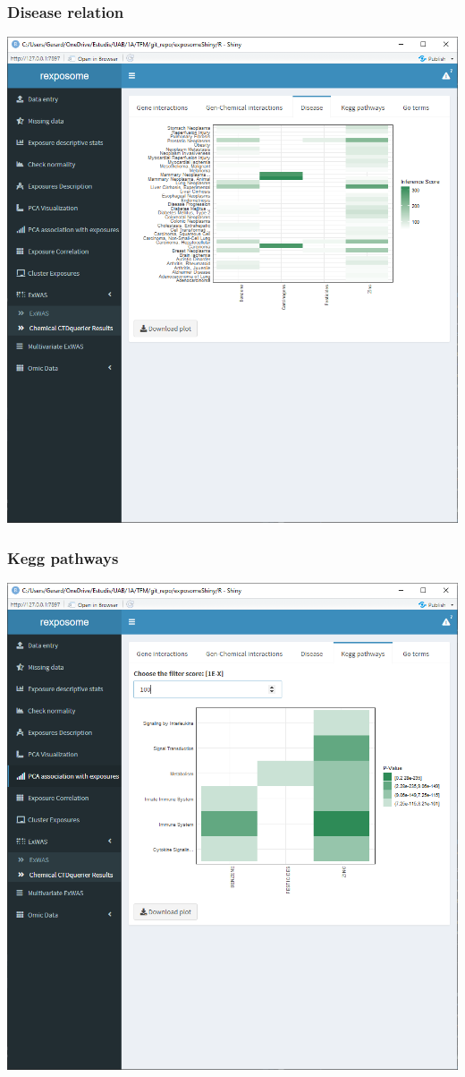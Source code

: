 \documentclass[
]{book}
\begin{document}
\hypertarget{disease-relation}{%
\subsubsection{Disease relation}\label{disease-relation}}

\includegraphics{images/analysis7_4_5.png}

\hypertarget{kegg-pathways}{%
\subsubsection{Kegg pathways}\label{kegg-pathways}}

\includegraphics{images/analysis7_4_6.png}
\end{document}
